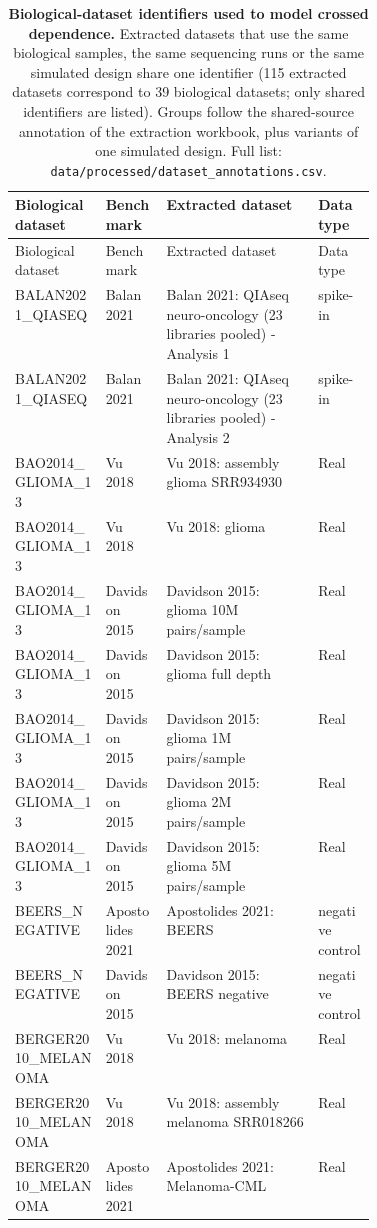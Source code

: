 {\scriptsize
\begin{longtable}{llp{0.42\linewidth}l}
\caption{\textbf{Biological-dataset identifiers used to model crossed dependence.} Extracted datasets that use the same biological samples, the same sequencing runs or the same simulated design share one identifier (115 extracted datasets correspond to 39 biological datasets; only shared identifiers are listed). Groups follow the shared-source annotation of the extraction workbook, plus variants of one simulated design. Full list: \texttt{data/processed/dataset\_annotations.csv}.}\label{tab:supp_bio_dataset_map}\\
\toprule
Biological dataset & Benchmark & Extracted dataset & Data type \\
\midrule
\endfirsthead
\toprule
Biological dataset & Benchmark & Extracted dataset & Data type \\
\midrule
\endhead
BALAN2021\_QIASEQ & Balan 2021 & Balan 2021: QIAseq neuro-oncology (23 libraries pooled) - Analysis 1 & spike-in \\
BALAN2021\_QIASEQ & Balan 2021 & Balan 2021: QIAseq neuro-oncology (23 libraries pooled) - Analysis 2 & spike-in \\
BAO2014\_GLIOMA\_13 & Vu 2018 & Vu 2018: assembly glioma SRR934930 & Real \\
BAO2014\_GLIOMA\_13 & Vu 2018 & Vu 2018: glioma & Real \\
BAO2014\_GLIOMA\_13 & Davidson 2015 & Davidson 2015: glioma 10M pairs/sample & Real \\
BAO2014\_GLIOMA\_13 & Davidson 2015 & Davidson 2015: glioma full depth & Real \\
BAO2014\_GLIOMA\_13 & Davidson 2015 & Davidson 2015: glioma 1M pairs/sample & Real \\
BAO2014\_GLIOMA\_13 & Davidson 2015 & Davidson 2015: glioma 2M pairs/sample & Real \\
BAO2014\_GLIOMA\_13 & Davidson 2015 & Davidson 2015: glioma 5M pairs/sample & Real \\
BEERS\_NEGATIVE & Apostolides 2021 & Apostolides 2021: BEERS & negative control \\
BEERS\_NEGATIVE & Davidson 2015 & Davidson 2015: BEERS negative & negative control \\
BERGER2010\_MELANOMA & Vu 2018 & Vu 2018: melanoma & Real \\
BERGER2010\_MELANOMA & Vu 2018 & Vu 2018: assembly melanoma SRR018266 & Real \\
BERGER2010\_MELANOMA & Apostolides 2021 & Apostolides 2021: Melanoma-CML & Real \\

\end{longtable}}
